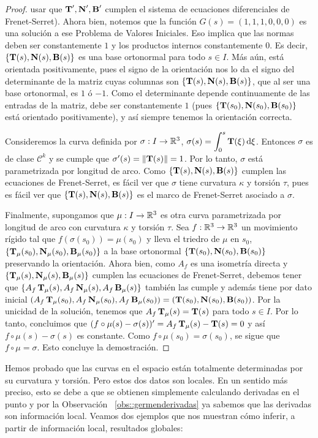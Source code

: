 \begin{teo}
\begin{proof}
usar que $\operatorname{\mathbf{T}}',\operatorname{\mathbf{N}}',\operatorname{\mathbf{B}}'$ cumplen el sistema de ecuaciones diferenciales de Frenet-Serret). Ahora bien, notemos que la función $G(s)=(1,1,1,0,0,0)$ es una solución a ese Problema de Valores Iniciales. Eso implica que las normas deben ser constantemente $1$ y los productos internos constantemente $0$. Es decir, $\{\operatorname{\mathbf{T}}(s),\operatorname{\mathbf{N}}(s),\operatorname{\mathbf{B}}(s)\}$ es una base ortonormal para todo $s\in I$. Más aún, está orientada positivamente, pues el signo de la orientación nos lo da el signo del determinante de la matriz cuyas columnas son $\{\operatorname{\mathbf{T}}(s),\operatorname{\mathbf{N}}(s),\operatorname{\mathbf{B}}(s)\}$, que al ser una base ortonormal, es $1$ ó $-1$. Como el determinante depende continuamente de las entradas de la matriz, debe ser constantemente $1$ (pues $\{\operatorname{\mathbf{T}}(s_0),\operatorname{\mathbf{N}}(s_0),\operatorname{\mathbf{B}}(s_0)\}$ está orientado positivamente), y así siempre tenemos la orientación correcta.

Consideremos la curva definida por $\sigma:I\to\mathbb{R}^3$, $\sigma(s)=\displaystyle\int_{0}^s \operatorname{\mathbf{T}}(\xi)\mathop{}\!\mathrm{d}\xi$. Entonces $\sigma$ es de clase $\mathscr{C}^k$ y se cumple que $\sigma'(s)=\left\| \operatorname{\mathbf{T}}(s) \right\|=1$. Por lo tanto, $\sigma$ está parametrizada por longitud de arco. Como $\{\operatorname{\mathbf{T}}(s),\operatorname{\mathbf{N}}(s),\operatorname{\mathbf{B}}(s)\}$ cumplen las ecuaciones de Frenet-Serret, es fácil ver que $\sigma$ tiene curvatura $\kappa$ y torsión $\tau$, pues es fácil ver que $\{\operatorname{\mathbf{T}}(s),\operatorname{\mathbf{N}}(s),\operatorname{\mathbf{B}}(s)\}$ es el marco de Frenet-Serret asociado a $\sigma$.

Finalmente, supongamos que $\mu:I\to\mathbb{R}^3$ es otra curva parametrizada por longitud de arco con curvatura $\kappa$ y torsión $\tau$. Sea $f:\mathbb{R}^3\to\mathbb{R}^3$ un movimiento rígido tal que $f(\sigma(s_0))=\mu(s_0)$ y lleva el triedro de $\mu$ en $s_0$, $\{\operatorname{\mathbf{T}}_\mu(s_0),\operatorname{\mathbf{N}}_\mu(s_0),\operatorname{\mathbf{B}}_\mu(s_0)\}$ a la base ortonormal $\{\operatorname{\mathbf{T}}(s_0),\operatorname{\mathbf{N}}(s_0),\operatorname{\mathbf{B}}(s_0)\}$ preservando la orientación. Ahora bien, como $A_f$ es una isometría directa y $\{\operatorname{\mathbf{T}}_\mu(s),\operatorname{\mathbf{N}}_\mu(s),\operatorname{\mathbf{B}}_\mu(s)\}$ cumplen las ecuaciones de Frenet-Serret, debemos tener que $\{A_f\operatorname{\mathbf{T}}_\mu(s),A_f\operatorname{\mathbf{N}}_\mu(s),A_f\operatorname{\mathbf{B}}_\mu(s)\}$ también las cumple y además tiene por dato inicial $(A_f\operatorname{\mathbf{T}}_\mu(s_0),A_f\operatorname{\mathbf{N}}_\mu(s_0),A_f\operatorname{\mathbf{B}}_\mu(s_0))=(\operatorname{\mathbf{T}}(s_0),\operatorname{\mathbf{N}}(s_0),\operatorname{\mathbf{B}}(s_0))$. Por la unicidad de la solución, tenemos que $A_f\operatorname{\mathbf{T}}_\mu(s)=\operatorname{\mathbf{T}}(s)$ para todo $s\in I$. Por lo tanto, concluimos que $(f\circ \mu(s) - \sigma(s))' = A_f\operatorname{\mathbf{T}}_\mu(s)-\operatorname{\mathbf{T}}(s) = 0$ y así $f\circ\mu(s)-\sigma(s)$ es constante. Como $f\circ\mu(s_0)=\sigma(s_0)$, se sigue que $f\circ\mu =\sigma$. Esto concluye la demostración.
\end{proof}
\end{teo}

Hemos probado que las curvas en el espacio están totalmente determinadas por su curvatura y torsión. Pero estos dos datos son locales. En un sentido más preciso, esto se debe a que se obtienen simplemente calculando derivadas en el punto y por la Observación ~\ref{obs::germenderivadas} ya sabemos que las derivadas son información local. Veamos dos ejemplos que nos muestran cómo inferir, a partir de información local, resultados globales:

